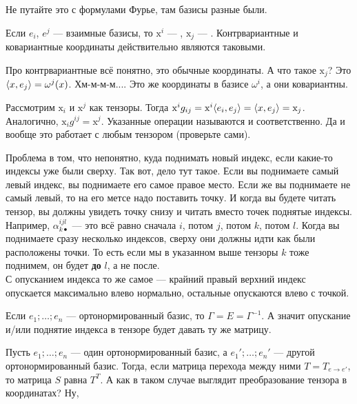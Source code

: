 \documentclass{article}
\begin{document}
\begin{itemize}
\begin{Comment}
            Не путайте это с формулами Фурье, там базисы разные были.
        \end{Comment}
        \dfn Если $e_i$, $e^j$ --- взаимные базисы, то $\mathrm x^i$ --- , $\mathrm x_j$ --- .
        \thm Контрвариантные и ковариантные координаты действительно являются таковыми.
        \begin{Proof}
            Про контрвариантные всё понятно, это обычные координаты. А что такое $\mathrm x_j$? Это ${\left\langle{x},{e_j}\right\rangle}=\omega^j(x)$. Хм-м-м-м.... Это же координаты в базисе $\omega^i$, а они ковариантны.
        \end{Proof}
        \thm Рассмотрим $\mathrm x_i$ и $\mathrm x^j$ как тензоры. Тогда $\mathrm x^ig_{ij}=\mathrm x^i{\left\langle{e_i},{e_j}\right\rangle}={\left\langle{x},{e_j}\right\rangle}=\mathrm x_j$. Аналогично, $\mathrm x_ig^{ij}=\mathrm x^j$. Указанные операции называются  и  соответственно. Да и вообще это работает с любым тензором (проверьте сами).
        \begin{Comment}
            Проблема в том, что непонятно, куда поднимать новый индекс, если какие-то индексы уже были сверху. Так вот, дело тут такое. Если вы поднимаете самый левый индекс, вы поднимаете его самое правое место. Если же вы поднимаете не самый левый, то на его метсе надо поставить точку. И когда вы будете читать тензор, вы должны увидеть точку снизу и читать вместо точек поднятые индексы. Например, $\alpha^{ijl}_{k\bullet}$ --- это всё равно сначала $i$, потом $j$, потом $k$, потом $l$. Когда вы поднимаете сразу несколько индексов, сверху они должны идти как были расположены точки. То есть если мы в указанном выше тензоры $k$ тоже поднимем, он будет \textbf{до} $l$, а не после.\\
            С опусканием индекса то же самое --- крайний правый верхний индекс опускается максимально влево нормально, остальные опускаются влево с точкой.
        \end{Comment}
        \begin{Comment}
            Если $e_1;\ldots;e_n$ --- ортонормированный базис, то $\Gamma=E=\Gamma^{-1}$. А значит опускание и/или поднятие  индекса в тензоре будет давать ту же матрицу.
        \end{Comment}
        \begin{Comment}
            Пусть $e_1;\ldots;e_n$ --- один ортонормированный базис, а $e_1';\ldots;e_n'$ --- другой ортонормированный базис. Тогда, если матрица перехода между ними $T=T_{e\to e'}$, то матрица $S$ равна $T^T$. А как в таком случае выглядит преобразование тензора в координатах? Ну,

\end{Comment}
\end{itemize}
\end{document}

